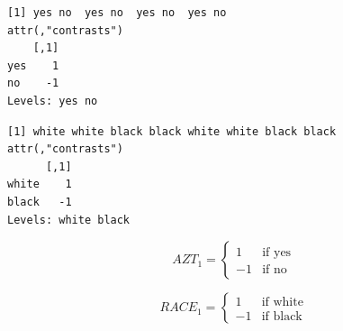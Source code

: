 \documentclass[]{book}
\newenvironment{Shaded}{\begin{snugshade}}{\end{snugshade}}
\newcommand{\DataTypeTok}[1]{\textcolor[rgb]{0.13,0.29,0.53}{#1}}
\newcommand{\KeywordTok}[1]{\textcolor[rgb]{0.13,0.29,0.53}{\textbf{#1}}}
\newcommand{\NormalTok}[1]{#1}
\newcommand{\OperatorTok}[1]{\textcolor[rgb]{0.81,0.36,0.00}{\textbf{#1}}}
\newcommand{\StringTok}[1]{\textcolor[rgb]{0.31,0.60,0.02}{#1}}
\begin{document}
\begin{Shaded}
\end{Shaded}

\begin{verbatim}
[1] yes no  yes no  yes no  yes no 
attr(,"contrasts")
    [,1]
yes    1
no    -1
Levels: yes no
\end{verbatim}

\begin{Shaded}
\end{Shaded}

\begin{verbatim}
[1] white white black black white white black black
attr(,"contrasts")
      [,1]
white    1
black   -1
Levels: white black
\end{verbatim}

\[AZT_1 = \begin{cases} 1 & \text{if yes} \\ -1 & \text{if no} \end{cases}\]

\[RACE_1 = \begin{cases} 1 & \text{if white} \\ -1 & \text{if black} \end{cases}\]

\begin{Shaded}
\end{Shaded}
\end{document}
